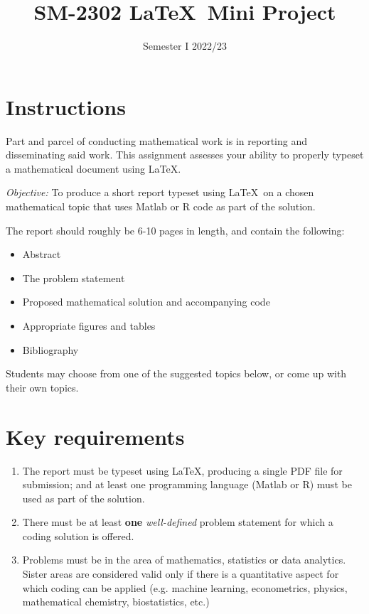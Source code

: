 \documentclass[a4paper,margins=1in]{article}
\title{SM-2302 \LaTeX~Mini Project}
\author{Semester I 2022/23}
\date{}
\begin{document}
\maketitle

\section*{Instructions}

Part and parcel of conducting mathematical work is in reporting and disseminating said work.
This assignment assesses your ability to properly typeset a mathematical document using \LaTeX.

\begin{displayquote}
\textit{Objective:} To produce a short report typeset using \LaTeX~on a chosen mathematical topic that uses Matlab or R code as part of the solution.
\end{displayquote}

The report should roughly be 6-10 pages in length, and contain the following:
\begin{itemize}
    \item Abstract
    \item The problem statement
    \item Proposed mathematical solution and accompanying code
    \item Appropriate figures and tables
    \item Bibliography
\end{itemize}

Students may choose from one of the suggested topics below, or come up with their own topics.

\section*{Key requirements}

\begin{enumerate}
    \item The report must be typeset using \LaTeX, producing a single PDF file for submission; and at least one programming language (Matlab or R) must be used as part of the solution.
    \item There must be at least \textbf{one} \emph{well-defined} problem statement for which a coding solution is offered.
    \item Problems must be in the area of mathematics, statistics or data analytics. Sister areas are considered valid only if there is a quantitative aspect for which coding can be applied (e.g. machine learning, econometrics, physics, mathematical chemistry, biostatistics, etc.)
\end{enumerate}
\end{document}
